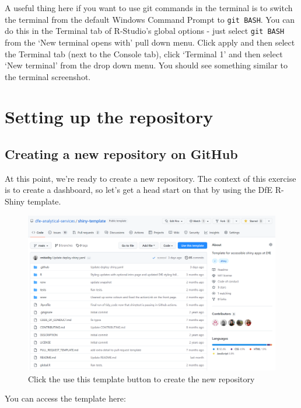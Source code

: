 \documentclass[
  12pt,
]{article}
\begin{document}
A useful thing here if you want to use git commands in the terminal is
to switch the terminal from the default Windows Command Prompt to
\texttt{git\ BASH}. You can do this in the Terminal tab of R-Studio's
global options - just select \texttt{git\ BASH} from the `New terminal
opens with' pull down menu. Click apply and then select the Terminal tab
(next to the Console tab), click `Terminal 1' and then select `New
terminal' from the drop down menu. You should see something similar to
the terminal screenshot.

\newpage

\hypertarget{setting-up-the-repository}{%
\section{Setting up the repository}\label{setting-up-the-repository}}

\hypertarget{creating-a-new-repository-on-github}{%
\subsection{Creating a new repository on
GitHub}\label{creating-a-new-repository-on-github}}

At this point, we're ready to create a new repository. The context of
this exercise is to create a dashboard, so let's get a head start on
that by using the DfE R-Shiny template.

\begin{figure}
\centering
\includegraphics{images/gitdemo/gitdemo-shinydash-template.png}
\caption{Click the use this template button to create the new
repository}
\end{figure}

You can access the template here:
\end{document}
